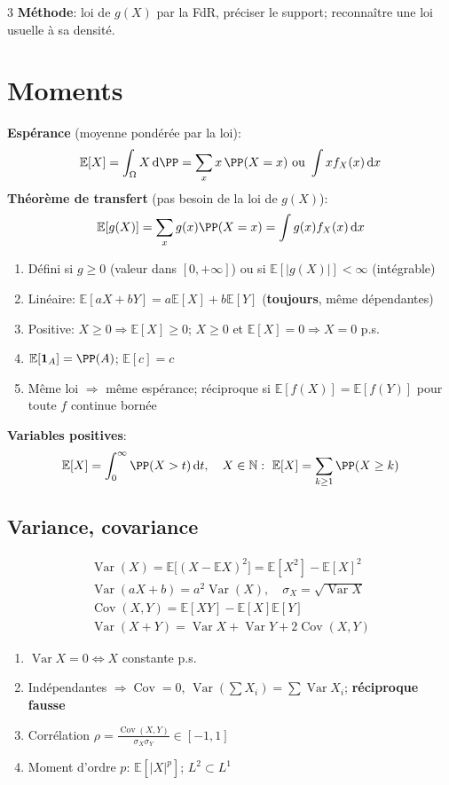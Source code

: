 \documentclass[12pt, a4paper]{article}
\newcommand{\dd}{\mathrm{d}}
\newcommand{\E}{\mathbb{E}}
\newcommand{\N}{\mathbb{N}}
\newcommand{\Var}{\operatorname{Var}}
\newcommand{\Cov}{\operatorname{Cov}}
\newcommand{\ind}{\mathbf{1}}
\begin{document}
\begin{multicols*}{3}
	\textbf{Méthode}: loi de $g(X)$ par la FdR, préciser le support; reconnaître une loi usuelle à sa densité.

	\colbreak
	\section{Moments}
	\textbf{Espérance} (moyenne pondérée par la loi):
	\begin{gather*}
		\E[X]=\int_\Omega X\,\dd\PP=\sum_xx\,\PP(X=x)\ \text{ou}\ \int xf_X(x)\,\dd x
	\end{gather*}
	\textbf{Théorème de transfert} (pas besoin de la loi de $g(X)$):
	\begin{gather*}
		\E[g(X)]=\sum_xg(x)\PP(X=x)=\int g(x)f_X(x)\,\dd x
	\end{gather*}
	\begin{enumerate}[\roman*.]
		\item Défini si $g\geq0$ (valeur dans $[0,+\infty]$) ou si $\E[|g(X)|]<\infty$ (intégrable)
		\item Linéaire: $\E[aX+bY]=a\E[X]+b\E[Y]$ (\textbf{toujours}, même dépendantes)
		\item Positive: $X\geq0\Rightarrow\E[X]\geq0$; $X\geq0$ et $\E[X]=0\Rightarrow X=0$ p.s.
		\item $\E[\ind_A]=\PP(A)$; $\E[c]=c$
		\item Même loi $\Rightarrow$ même espérance; réciproque si $\E[f(X)]=\E[f(Y)]$ pour toute $f$ continue bornée
	\end{enumerate}
	\textbf{Variables positives}:
	\begin{gather*}
		\E[X]=\int_0^\infty\PP(X>t)\,\dd t,\quad X\in\N:\ \E[X]=\sum_{k\geq1}\PP(X\geq k)
	\end{gather*}

	\subsection{Variance, covariance}
	\begin{gather*}
		\Var(X)=\E\big[(X-\E X)^2\big]=\E[X^2]-\E[X]^2\\
		\Var(aX+b)=a^2\Var(X),\quad\sigma_X=\sqrt{\Var X}\\
		\Cov(X,Y)=\E[XY]-\E[X]\E[Y]\\
		\Var(X+Y)=\Var X+\Var Y+2\Cov(X,Y)
	\end{gather*}
	\begin{enumerate}[\roman*.]
		\item $\Var X=0\iff X$ constante p.s.
		\item Indépendantes $\Rightarrow\Cov=0$, $\Var(\sum X_i)=\sum\Var X_i$; \textbf{réciproque fausse}
		\item Corrélation $\rho=\frac{\Cov(X,Y)}{\sigma_X\sigma_Y}\in[-1,1]$
		\item Moment d'ordre $p$: $\E[|X|^p]$; $L^2\subset L^1$
	\end{enumerate}


\end{multicols*}
\end{document}
